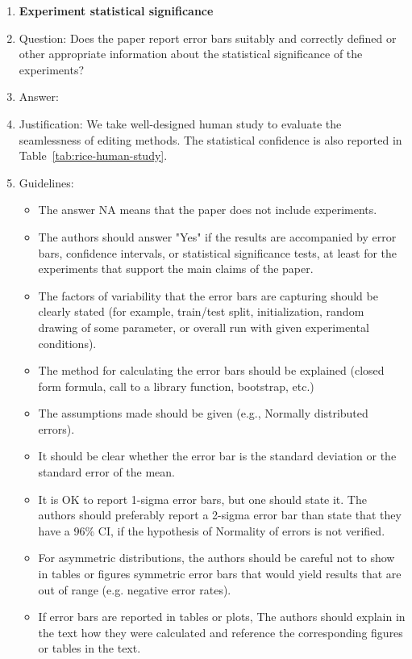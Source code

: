 \documentclass{article}
\begin{document}
\begin{enumerate}
\item {\bf Experiment statistical significance}
    \item[] Question: Does the paper report error bars suitably and correctly defined or other appropriate information about the statistical significance of the experiments?
    \item[] Answer: \answerYes{} %
    \item[] Justification: We take well-designed human study to evaluate the seamlessness of editing methods. The statistical confidence is also reported in Table~\ref{tab:rice-human-study}.
    \item[] Guidelines:
    \begin{itemize}
        \item The answer NA means that the paper does not include experiments.
        \item The authors should answer "Yes" if the results are accompanied by error bars, confidence intervals, or statistical significance tests, at least for the experiments that support the main claims of the paper.
        \item The factors of variability that the error bars are capturing should be clearly stated (for example, train/test split, initialization, random drawing of some parameter, or overall run with given experimental conditions).
        \item The method for calculating the error bars should be explained (closed form formula, call to a library function, bootstrap, etc.)
        \item The assumptions made should be given (e.g., Normally distributed errors).
        \item It should be clear whether the error bar is the standard deviation or the standard error of the mean.
        \item It is OK to report 1-sigma error bars, but one should state it. The authors should preferably report a 2-sigma error bar than state that they have a 96\% CI, if the hypothesis of Normality of errors is not verified.
        \item For asymmetric distributions, the authors should be careful not to show in tables or figures symmetric error bars that would yield results that are out of range (e.g. negative error rates).
        \item If error bars are reported in tables or plots, The authors should explain in the text how they were calculated and reference the corresponding figures or tables in the text.
    \end{itemize}


\end{enumerate}
\end{document}
